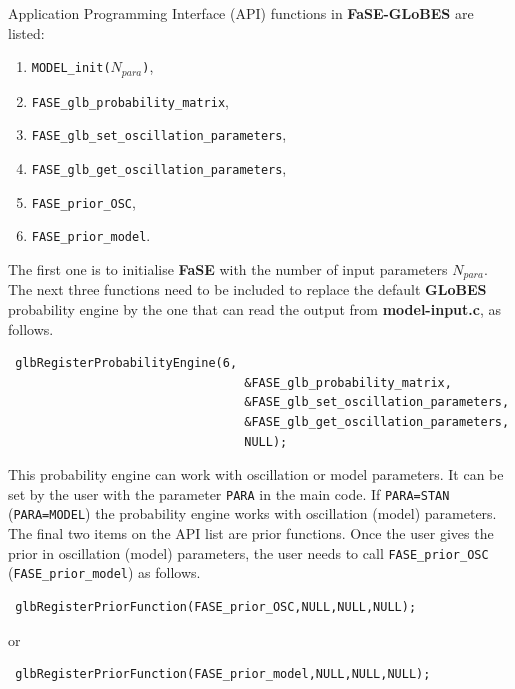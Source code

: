 \documentclass[aps,prd,nofootinbib,preprint]{revtex4}
\begin{document}
Application Programming Interface (API) functions in \textbf{FaSE-GLoBES} are listed:
\begin{enumerate}
\item \texttt{MODEL\_init($N_{para}$)},
\item  \texttt{FASE\_glb\_probability\_matrix},
\item  \texttt{FASE\_glb\_set\_oscillation\_parameters},
\item  \texttt{FASE\_glb\_get\_oscillation\_parameters},
\item \texttt{FASE\_prior\_OSC},
\item \texttt{FASE\_prior\_model}.
\end{enumerate}
The first one is to initialise \textbf{FaSE} with the number of input parameters $N_{para}$. The next three functions need to be included to replace the default \textbf{GLoBES} probability engine by the one that can read the output from \textbf{model-input.c}, as follows.
\begin{verbatim}
 glbRegisterProbabilityEngine(6,
                                 &FASE_glb_probability_matrix,
                                 &FASE_glb_set_oscillation_parameters,
                                 &FASE_glb_get_oscillation_parameters,
                                 NULL);
\end{verbatim}

This probability engine can work with oscillation or model parameters. It can be set by the user with the parameter \texttt{PARA} in the main code. If \texttt{PARA=STAN} (\texttt{PARA=MODEL}) the probability engine works with oscillation (model) parameters. The final two items on the API list are prior functions. Once the user gives the prior in oscillation (model) parameters, the user needs to call \texttt{FASE\_prior\_OSC} (\texttt{FASE\_prior\_model}) as follows.
\begin{verbatim}
 glbRegisterPriorFunction(FASE_prior_OSC,NULL,NULL,NULL);
\end{verbatim}
or
\begin{verbatim}
 glbRegisterPriorFunction(FASE_prior_model,NULL,NULL,NULL);
\end{verbatim}
\end{document}
